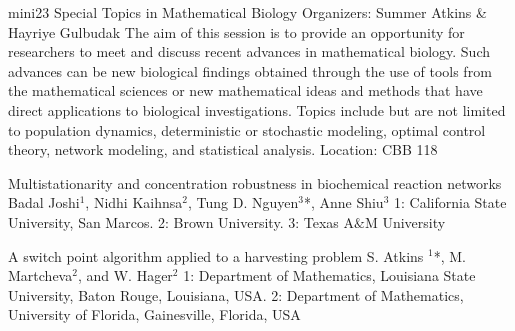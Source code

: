 \mini
{mini23}
{Special Topics in Mathematical Biology}
{Organizers: Summer Atkins \& Hayriye Gulbudak}
{The aim of this session is to provide an opportunity for researchers to meet and discuss recent advances in mathematical biology. Such advances can be new biological findings obtained through the use of tools from the mathematical sciences or  new mathematical ideas and methods that have direct applications to biological investigations. Topics include but are not limited to population dynamics, deterministic or stochastic modeling, optimal control theory, network modeling, and statistical analysis.}
{Location: CBB 118}

\begin{talks}
\item\talk
{Multistationarity and concentration robustness in biochemical reaction networks}
{Badal Joshi$^{1}$, Nidhi Kaihnsa$^{2}$, Tung D. Nguyen$^{3}$*, Anne Shiu$^{3}$}
{1: California State University, San Marcos. 2: Brown University. 3: Texas A$\&$M University}
\item\talk
{A switch point algorithm applied to a harvesting problem}
{S. Atkins {$^{1}$*},  M. Martcheva{$^{2}$}, and W. Hager{$^{2}$}}
{1: Department of Mathematics, Louisiana State University, Baton Rouge, Louisiana, USA. 2: Department of Mathematics, University of Florida, Gainesville, Florida, USA}
\end{talks}
\room
